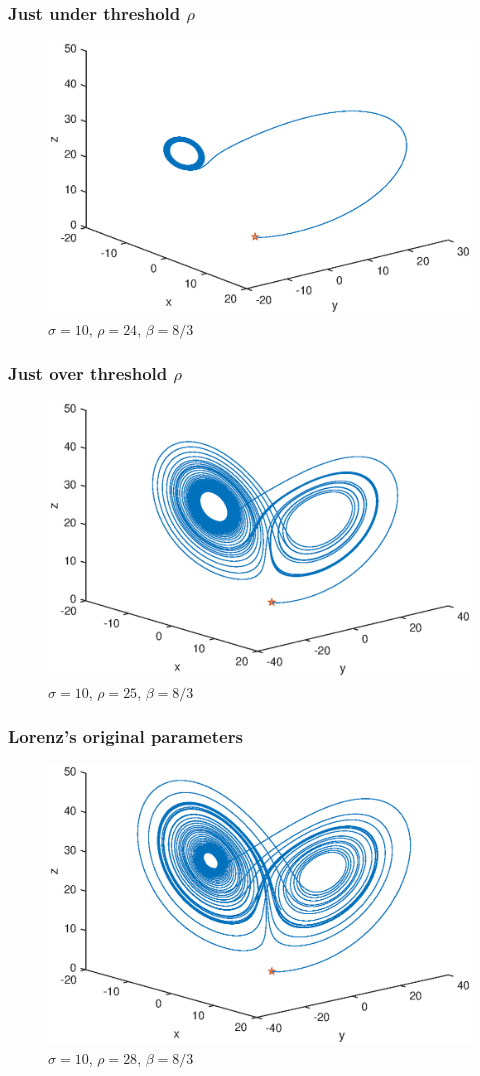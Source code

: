 \documentclass{beamer}
\begin{document}

\begin{frame}
    \frametitle{Just under threshold $\rho$}
    \begin{figure}
        \includegraphics[width=0.7\linewidth]{r24}
        \caption{$\sigma = 10$, $\rho = 24$, $\beta = 8/3$}
    \end{figure}
\end{frame}


\begin{frame}
    \frametitle{Just over threshold $\rho$}
    \begin{figure}
        \includegraphics[width=0.7\linewidth]{r25}
        \caption{$\sigma = 10$, $\rho = 25$, $\beta = 8/3$}
    \end{figure}
\end{frame}


\begin{frame}
    \frametitle{Lorenz's original parameters}
    \begin{figure}
        \includegraphics[width=0.7\linewidth]{r28}
        \caption{$\sigma = 10$, $\rho = 28$, $\beta = 8/3$}
    \end{figure}
\end{frame}
\end{document}
